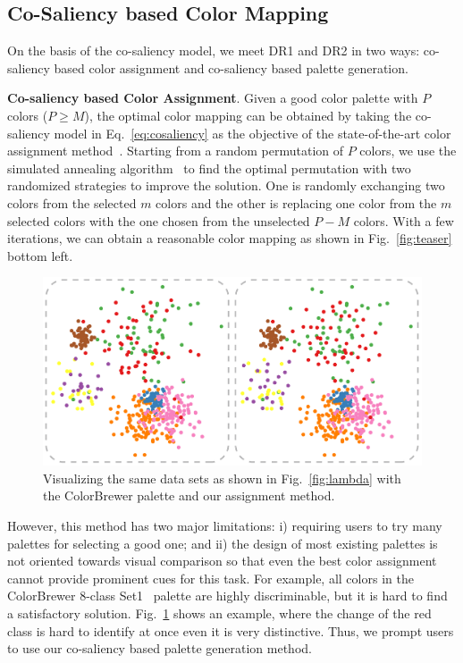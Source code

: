\subsection{Co-Saliency based Color Mapping}
\label{subsec:solver}
On the basis of the co-saliency model, we meet DR1 and DR2 in two ways: co-saliency based color assignment and co-saliency based palette generation.

\vspace{1.5mm}
\noindent\textbf{Co-saliency based Color Assignment}.
Given a good color palette with $P$ colors ($P\geq M$), the optimal color mapping can be obtained by
taking the co-saliency model in Eq.~\ref{eq:cosaliency} as the objective of the state-of-the-art color assignment method~\cite{Wang2018}. Starting from a random permutation of $P$ colors, we use the simulated annealing algorithm~\cite{aarts1989stochastic} to find the optimal permutation with two randomized strategies to improve the solution. One is randomly exchanging two colors from the selected $m$ colors and the other is replacing one color from the $m$ selected colors with the one chosen from the unselected $P-M$ colors. With a few iterations, we can obtain a reasonable color mapping as shown in Fig.~\ref{fig:teaser} bottom left.

\begin{figure}[h]
\centering
\includegraphics[width=.8\columnwidth]{figures/colorbrewer.pdf}
\caption{Visualizing the same data sets as shown in Fig.~\ref{fig:lambda} with the ColorBrewer palette and our assignment method.}
\vspace*{-3mm}
\label{fig:colorbrewer}
\end{figure}

However, this method has two major limitations: i) requiring users to try many palettes for selecting a good one; and ii) the design of most existing palettes is not oriented towards visual comparison so that even the best color assignment cannot provide prominent cues for this task.
For example, all colors in the ColorBrewer 8-class Set1~\cite{harrower2003colorbrewer} palette are highly discriminable, but it is hard to find a satisfactory solution. Fig.~\ref{fig:colorbrewer} shows an example, where the change of the red class is hard to identify at once even it is very distinctive. Thus, we prompt users to use our co-saliency based palette generation method.



